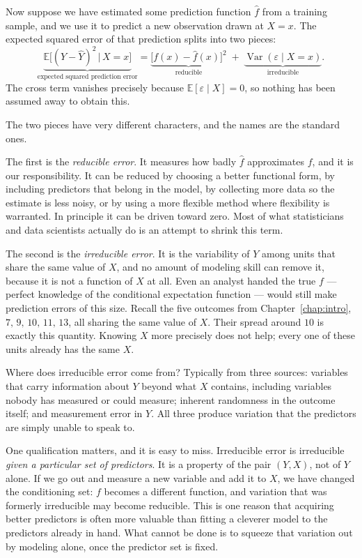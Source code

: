 \documentclass[11pt]{report}
\newcommand{\E}{\mathbb{E}}
\newcommand{\Var}{\operatorname{Var}}
\begin{document}
Now suppose we have estimated some prediction function \(\widehat{f}\) from a training sample, and we use it to predict a new observation drawn at \(X=x\). The expected squared error of that prediction splits into two pieces:
\[
\underbrace{\E\big[(Y-\widehat{Y})^2 \,\big|\, X=x\big]}_{\text{expected squared prediction error}}
=
\underbrace{\big[f(x)-\widehat{f}(x)\big]^2}_{\text{reducible}}
\;+\;
\underbrace{\Var(\varepsilon\mid X=x)}_{\text{irreducible}} .
\]
The cross term vanishes precisely because \(\E[\varepsilon\mid X]=0\), so nothing has been assumed away to obtain this.

The two pieces have very different characters, and the names are the standard ones.

The first is the \emph{reducible error}. It measures how badly \(\widehat{f}\) approximates \(f\), and it is our responsibility. It can be reduced by choosing a better functional form, by including predictors that belong in the model, by collecting more data so the estimate is less noisy, or by using a more flexible method where flexibility is warranted. In principle it can be driven toward zero. Most of what statisticians and data scientists actually do is an attempt to shrink this term.

The second is the \emph{irreducible error}. It is the variability of \(Y\) among units that share the same value of \(X\), and no amount of modeling skill can remove it, because it is not a function of \(X\) at all. Even an analyst handed the true \(f\) --- perfect knowledge of the conditional expectation function --- would still make prediction errors of this size. Recall the five outcomes from Chapter~\ref{chap:intro}, \(7,\,9,\,10,\,11,\,13\), all sharing the same value of \(X\). Their spread around \(10\) is exactly this quantity. Knowing \(X\) more precisely does not help; every one of these units already has the same \(X\).

Where does irreducible error come from? Typically from three sources: variables that carry information about \(Y\) beyond what \(X\) contains, including variables nobody has measured or could measure; inherent randomness in the outcome itself; and measurement error in \(Y\). All three produce variation that the predictors are simply unable to speak to.

One qualification matters, and it is easy to miss. Irreducible error is irreducible \emph{given a particular set of predictors}. It is a property of the pair \((Y,X)\), not of \(Y\) alone. If we go out and measure a new variable and add it to \(X\), we have changed the conditioning set: \(f\) becomes a different function, and variation that was formerly irreducible may become reducible. This is one reason that acquiring better predictors is often more valuable than fitting a cleverer model to the predictors already in hand. What cannot be done is to squeeze that variation out by modeling alone, once the predictor set is fixed.
\end{document}
